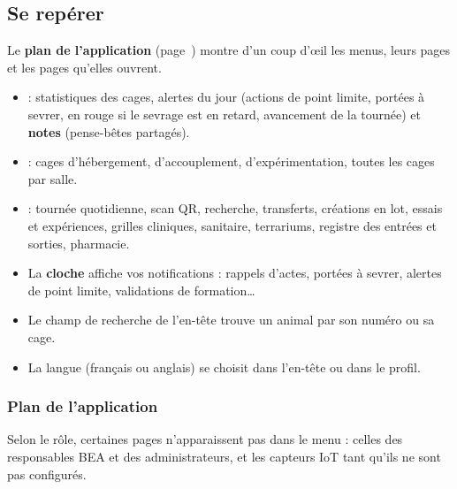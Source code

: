 \documentclass[11pt,a4paper]{article}
\begin{document}
\subsection{Se repérer}
Le \textbf{plan de l'application} (page~\pageref{plan}) montre d'un coup
d'œil les menus, leurs pages et les pages qu'elles ouvrent.
\begin{itemize}
  \item {} : statistiques des cages, alertes du jour (actions
    de point limite, portées à sevrer, en rouge si le sevrage est en retard,
    avancement de la tournée) et \textbf{notes} (pense-bêtes partagés).
  \item {} : cages d'hébergement, d'accouplement,
    d'expérimentation, toutes les cages par salle.
  \item {} : tournée quotidienne, scan QR, recherche, transferts,
    créations en lot, essais et expériences, grilles cliniques, sanitaire,
    terrariums, registre des entrées et sorties, pharmacie.
  \item La \textbf{cloche} affiche vos notifications : rappels d'actes,
    portées à sevrer, alertes de point limite, validations de formation…
  \item Le champ de recherche de l'en-tête trouve un animal par son numéro ou
    sa cage.
  \item La langue (français ou anglais) se choisit dans l'en-tête ou dans le
    profil.
\end{itemize}

\begin{landscape}
\subsubsection*{Plan de l'application}\label{plan}
\begin{center}
\resizebox{\linewidth}{!}{}
\end{center}
{\small Selon le rôle, certaines pages n'apparaissent pas dans le menu : celles
des responsables BEA et des administrateurs, et les capteurs IoT tant
qu'ils ne sont pas configurés.}
\end{landscape}
\end{document}
